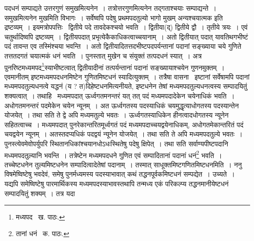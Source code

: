 \documentclass[11pt, openany]{book}
\begin{document}
\noindent पदधनं सम्पाद्यते उत्तरगुणं समुखमित्यनेन~। तत्रोत्तरगुणमित्यनेन तद्गताश्चयाः सम्पाद्यन्ते~। समुखमित्यनेन मुखमिति विभागः~। सर्वेष्वपि पदेषु प्रथमपदतुल्यो भागो मुखम् अन्यश्चयात्मक इति द्रष्टव्यम्~। इयमत्रोपपत्तिः \textendash\ द्वितीये पदे तावदेकश्चयो भवति~। द्वितीया(द्) द्वितीये द्वौ~। तृतीये त्रयः~। एवं चतुर्थादिष्वपि द्रष्टव्यम्~। द्वितीयपदात् प्रभृत्येकैकाधिकत्वाच्चयानाम्~। अतो द्वितीयात् पदात्  यावतिथगभीष्टं पदं तावन्त एव तस्मिंश्चया भवन्ति~। अतो द्वितीयादितत्तदभीष्टपदपर्यन्तानां पदानां सङ्ख्याया चये गुणिते तत्ततदगतं चयात्मकं धनं भवति~। पुनस्तात् मुखेन च संयुक्तं तत्पदधनं स्यात्~। अत्र पुनरिष्टमध्यमपद\renewcommand{\thefootnote}{१}\footnote{मध्यपद \textendash\ ख. पाठः.}स्याभीष्टत्वात् द्वितीयादीनां तत्पर्यन्तानां पदानां सङ्ख्यायाश्चयेन गुणनमुक्तम्~। एवमानीतम् इष्टमध्यमपदधनमिष्टेन गुणितमिष्टधनं स्यादित्युक्तम्~। तत्रैषा वासना \textendash\ इष्टानां सर्वेषामपि पदानां मध्यमपदतुल्यधनत्वे यद्धनं (य ? त)दिहेष्टधनमित्यनीयते, इष्टधनेन तेषां मध्यमपदतुल्यधनत्वस्य सम्पादयितुं शक्यत्वात्~। तथाहि \textendash\ मध्यमपदात् ऊर्ध्वगतमनन्तरं यत् तत् पदं मध्यमपदादेकेन चयेनाधिकं भवति~। अधोगतमनन्तरं पदमेकेन चयेन न्यूनम्~। अत ऊर्ध्वगतस्य पदस्याधिकं चयमुद्धृत्याधोगतस्य पदस्यान्तेन योजयेत्~। तथा सति ते द्वे अपि मध्यमतुल्ये भवतः~। ऊर्ध्वगतस्याधिकेन हीनत्वादधोगतस्य न्यूनेन सहितत्वाच्च~। मध्यमपदात् पुनरेकान्तरितमूर्ध्वगतं पदं मध्यमपदाच्चयद्वयेनाधिकम्, अधोगतमेकान्तरितं पदं चयद्वयेन न्यूनम्~। अतस्तदप्यधिकं पदद्वयं न्यूनेन योजयेत्~। तथा सति ते अपि मध्यमपदतुल्ये भवतः~। पुनस्त्येवमेवोपर्युपरि स्थितानधिकांश्चयानधोऽधःस्थितेषु पदेषु क्षिपेत्~। तथा सति सर्वाण्यपीष्टपदानि मध्यमपदतुल्यानि भवन्ति~। तत्रेष्टेन मध्यमपदधने गुणित एवं सम्पादितानां पदानां धनं\renewcommand{\thefootnote}{२}\footnote{तानां धनं \textendash\ क. पाठः.} भवति~। तच्चेष्टधनेन तुल्यमिष्टधनेन सम्पादित्वादेतेषां पदानाम्~। तस्मात् साधूक्तमिष्टगणितमिष्टधनमिति~। ननु विषमेष्विष्टेषु भवदेवं, समेषु पुनर्मध्यमस्य पदस्याभावात् कथं तद्धनपूर्वकमिष्टधनं सम्पद्येत~। उच्यते~। यद्यपि समेष्विष्टेषु पारमार्थिकस्य मध्यमपदस्याभावस्तथापि तन्मध्य एकं परिकल्प्य तद्धनमानीयेष्टधनं सम्पादयितुं शक्यम्~। तत्र यदा
\newpage
\end{document}
